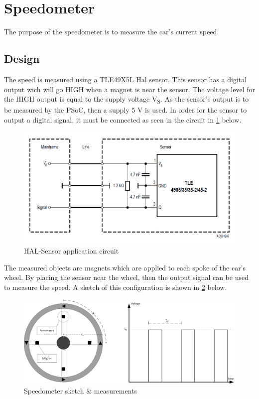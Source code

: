 \section{Speedometer}
The purpose of the speedometer is to measure the car's current speed.

\subsection{Design}
The speed is measured using a TLE49X5L Hal sensor. This sensor has a digital output wich will go HIGH when a magnet is near the sensor. The voltage level for the HIGH output is equal to the supply voltage V\textsubscript{S}. As the sensor's output is to be measured by the PSoC, then a supply 5 V is used.
In order for the sensor to output a digital signal, it must be connected as seen in the circuit in \ref{fig:HAL_application} below.

\begin{figure}[H]
	\centering
	\includegraphics[width=0.6\linewidth]{Hardware/Pictures/HAL_Application}
	\caption{HAL-Sensor application circuit}
	\label{fig:HAL_application}
\end{figure}

The measured objects are magnets  which are applied to each spoke of the car's wheel. By placing the sensor near the wheel, then the output signal can be used to measure the speed. A sketch of this configuration is shown in \ref{fig:Speed_sketch} below.

\begin{figure}[H]
	\centering
	\includegraphics[width=0.9\linewidth]{Hardware/Pictures/Speedometer_Sketch}
	\caption{Speedometer sketch \& measurements}
	\label{fig:Speed_sketch}
\end{figure}

